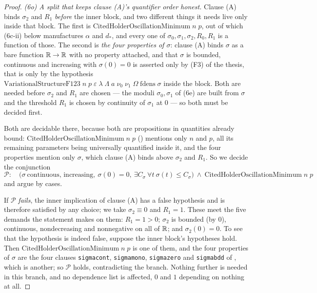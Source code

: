 \begin{proof}
\emph{(6o) A split that keeps clause \textup{(A)}'s quantifier order honest.}
Clause (A) binds $\sigma_2$ and $R_1$ \emph{before} the inner block, and two
different things it needs live only inside that block.  The first is
$\mathrm{CitedHolderOscillationMinimum}\;n\;p$, out of which (6c-ii) below
manufactures $\alpha$ and $d_\ast$, and every one of
$\sigma_0,\sigma_1,\sigma_2,R_0,R_1$ is a function of those.  The second is
\emph{the four properties of $\sigma$}: clause (A) binds $\sigma$ as a bare
function $\mathbb{R}\to\mathbb{R}$ with no property attached, and that $\sigma$ is bounded,
continuous and increasing with $\sigma(0)=0$ is asserted only by
(F3) of the thesis, that is only by the hypothesis
$\mathrm{VariationalStructureF123}\;n\;p\;\varepsilon\;\lambda\;\Lambda\;a\;
\nu_0\;\nu_1\;\Omega\;\mathrm{fdens}\;\sigma$ inside the block.  Both are
needed before $\sigma_2$ and $R_1$ are chosen --- the moduli $\sigma_0,\sigma_1$
of (6e) are built from $\sigma$ and the threshold $R_1$ is chosen by continuity
of $\sigma_1$ at $0$ --- so both must be decided first.

Both are decidable there, because both are propositions in quantities already
bound: $\mathrm{CitedHolderOscillationMinimum}\;n\;p$
() mentions only $n$ and $p$, all its
remaining parameters being universally quantified inside it, and the four
properties mention only $\sigma$, which clause (A) binds above $\sigma_2$ and
$R_1$.  So we decide the conjunction
\[
\mathcal P:\quad\bigl(\sigma\ \text{continuous, increasing},\ \sigma(0)=0,\
\exists C_\sigma\ \forall t\ \sigma(t)\le C_\sigma\bigr)\ \wedge\
\mathrm{CitedHolderOscillationMinimum}\;n\;p
\]
and argue by cases.

If $\mathcal P$ \emph{fails}, the inner implication of clause (A) has a false
hypothesis and is therefore satisfied by any choice; we take $\sigma_2\equiv0$
and $R_1=1$.  These meet the five demands the statement makes on them:
$R_1=1>0$; $\sigma_2$ is bounded (by $0$), continuous, nondecreasing and
nonnegative on all of $\mathbb{R}$; and $\sigma_2(0)=0$.  To see that the hypothesis is
indeed false, suppose the inner block's hypotheses hold.  Then
$\mathrm{CitedHolderOscillationMinimum}\;n\;p$ is one of them, and the four
properties of $\sigma$ are the four clauses \texttt{sigmacont},
\texttt{sigmamono}, \texttt{sigmazero} and \texttt{sigmabdd} of
\noderef{VariationalStructureF123}, which is another; so $\mathcal P$ holds,
contradicting the branch.  Nothing further is needed in this branch, and no
dependence list is affected, $0$ and $1$ depending on nothing at all.


\end{proof}
